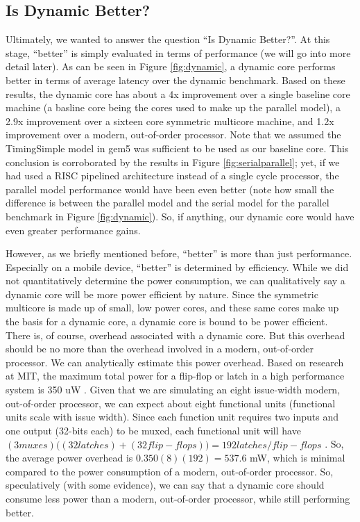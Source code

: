 \subsection{Is Dynamic Better?}
Ultimately, we wanted to answer the question ``Is Dynamic Better?''. At this stage, ``better'' is simply evaluated in terms of performance (we will go into more detail later). As can be seen in Figure \ref{fig:dynamic}, a dynamic core performs better in terms of average latency over the dynamic benchmark. Based on these results, the dynamic core has about a 4x improvement over a single baseline core machine (a basline core being the cores used to make up the parallel model), a 2.9x improvement over a sixteen core symmetric multicore machine, and 1.2x improvement over a modern, out-of-order processor. Note that we assumed the TimingSimple model in gem5 was sufficient to be used as our baseline core. This conclusion is corroborated by the results in Figure \ref{fig:serialparallel}; yet, if we had used a RISC pipelined architecture instead of a single cycle processor, the parallel model performance would have been even better (note how small the difference is between the parallel model and the serial model for the parallel benchmark in Figure \ref{fig:dynamic}). So, if anything, our dynamic core would have even greater performance gains.

However, as we briefly mentioned before, ``better'' is more than just performance. Especially on a mobile device, ``better'' is determined by efficiency. While we did not quantitatively determine the power consumption, we can qualitatively say a dynamic core will be more power efficient by nature. Since the symmetric multicore is made up of small, low power cores, and these same cores make up the basis for a dynamic core, a dynamic core is bound to be power efficient. There is, of course, overhead associated with a dynamic core. But this overhead should be no more than the overhead involved in a modern, out-of-order processor. We can analytically estimate this power overhead. Based on research at MIT, the maximum total power for a flip-flop or latch in a high performance system is 350 uW \cite{power}. Given that we are simulating an eight issue-width modern, out-of-order processor, we can expect about eight functional units (functional units scale with issue width). Since each function unit requires two inputs and one output (32-bits each) to be muxed, each functional unit will have $(3 muxes) \dot ((32 latches) + (32 flip-flops)) = 192 latches/flip-flops$ \cite{on-semi}. So, the average power overhead is $0.350(8)(192) = 537.6$ mW, which is minimal compared to the power consumption of a modern, out-of-order processor. So, speculatively (with some evidence), we can say that a dynamic core should consume less power than a modern, out-of-order processor, while still performing better.

